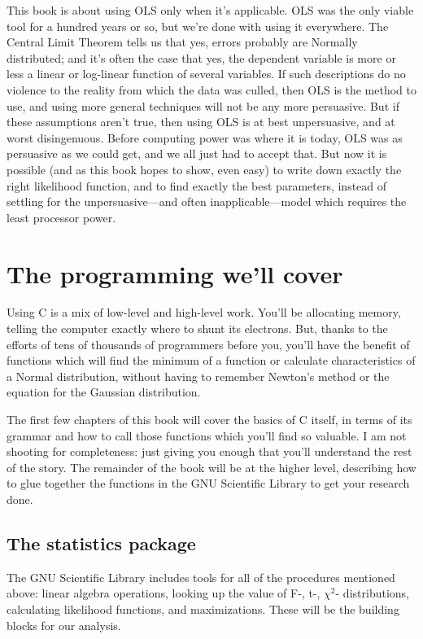 \documentclass[12pt,notitlepage, openany]{book}
\begin{document}
This book is about using OLS only when it's applicable. OLS was the only
viable tool for a hundred years or so, but we're done with using it everywhere.
The Central Limit Theorem tells us that yes, errors probably are
Normally distributed; and it's often the case that yes, the dependent
variable is more or less a linear or log-linear function of several
variables. If such descriptions do no violence to the reality from
which the data was culled, then OLS is the method to use, and using
more general techniques will not be any more persuasive. But if these
assumptions aren't true, then using OLS is at best unpersuasive, and at
worst disingenuous. Before computing power was where it is today, OLS was
as persuasive as we could get, and we all just had to accept that. But
now it is possible (and as this book hopes to show, even easy) to write
down exactly the right likelihood function, and to find exactly the best
parameters, instead of settling for the unpersuasive---and often
inapplicable---model which requires the least processor power.

\section{The programming we'll cover}

Using C is a mix of low-level and high-level
work. You'll be allocating memory, telling the computer exactly where
to shunt its electrons. But, thanks to the efforts of tens of thousands
of programmers before you, you'll have the benefit of functions which
will find the minimum of a function or calculate characteristics of a
Normal distribution, without having to remember Newton's method or
the equation for the Gaussian distribution.

The first few chapters of this book will cover the basics of C itself,
in terms of its grammar and how to call those functions which
you'll find so valuable. I am not shooting for completeness: just giving you enough that you'll
understand the rest of the story.  The remainder of the book will be at the higher
level, describing how to glue together the functions in the
GNU Scientific Library to get your research done.

\subsection{The statistics package} The GNU Scientific Library includes tools for
all of the procedures mentioned above: linear algebra operations, looking up the
value of F-, t-, $\chi^2$- distributions, calculating likelihood functions, and
maximizations. These will be the building blocks for our analysis.
\end{document}
